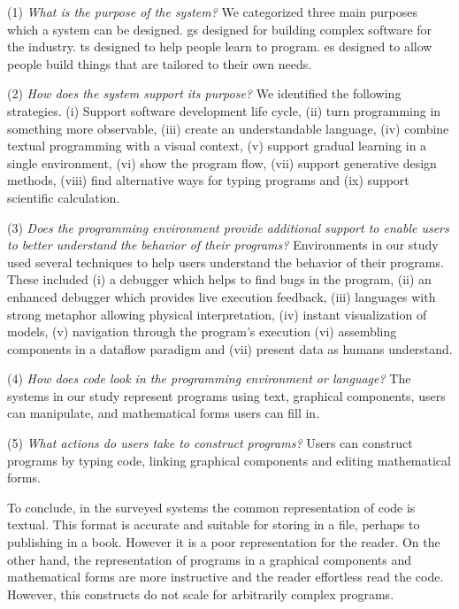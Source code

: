 (1) \textit{What is the purpose of the system?} We categorized three main purposes which a system can be designed. \ac{gs} designed for building complex software for the industry. \ac{ts} designed to help people learn to program. \ac{es} designed to allow people build things that are tailored to their own needs.

(2) \textit{How does the system support its purpose?} We identified the following strategies. (i) Support software development life cycle, (ii) turn programming in something more observable, (iii) create an understandable language, (iv) combine textual programming with a visual context, (v) support gradual learning in a single environment, (vi) show the program flow, (vii) support generative design methods, (viii) find alternative ways for typing programs and (ix) support scientific calculation.

(3) \textit{Does the programming environment provide additional support to enable users to better understand the behavior of their programs?} Environments in our study used several techniques to help users understand the behavior of their programs. These included (i) a debugger which helps to find bugs in the program, (ii) an enhanced debugger which provides live execution feedback, (iii) languages with strong metaphor allowing physical interpretation, (iv) instant visualization of models, (v) navigation through the program's execution (vi) assembling components in a dataflow paradigm and (vii) present data as humans understand.

(4) \textit{How does code look in the programming environment or language?} The systems in our study represent programs using text, graphical components, users can manipulate, and mathematical forms users can fill in.

(5) \textit{What actions do users take to construct programs?} Users can construct programs by typing code, linking graphical components and editing mathematical forms.

To conclude, in the surveyed systems the common representation of code is textual. This format is accurate and suitable for storing in a file, perhaps to publishing in a book. However it is a poor representation for the reader. On the other hand, the representation of programs in a graphical components and mathematical forms are more instructive and the reader effortless read the code. However, this constructs do not scale for arbitrarily complex programs.